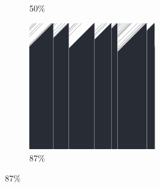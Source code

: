 \documentclass[12pt, fleqn]{report}                             %
\theoremstyle{break}                                            %
\begin{document}
\begin{figure}[ht!]
\begin{subfigure}[b]{0.4\linewidth}
          \caption{50\%}
        \end{subfigure}
        \begin{subfigure}[b]{0.4\linewidth}
          \includegraphics[width=0.6\textwidth]{Images/172/d.png}
          \caption{87\%}
        \end{subfigure}
      \end{figure}
\end{document}
